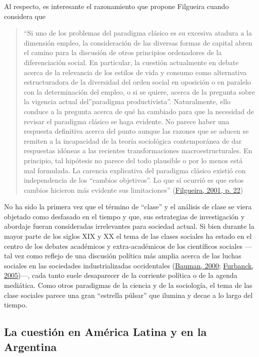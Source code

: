 \documentclass[
]{article}
\begin{document}
Al respecto, es interesante el razonamiento que propone Filgueira cuando considera que

\begin{quote}
``Si uno de los problemas del paradigma clásico es su excesiva atadura a la dimensión empleo, la consideración de las diversas formas de capital abren el camino para la discusión de otros principios ordenadores de la diferenciación social. En particular, la cuestión actualmente en debate acerca de la relevancia de los estilos de vida y consumo como alternativa estructuradora de la diversidad del orden social en oposición o en paralelo con la determinación del empleo, o si se quiere, acerca de la pregunta sobre la vigencia actual del''paradigma productivista''. Naturalmente, ello conduce a la pregunta acerca de qué ha cambiado para que la necesidad de revisar el paradigma clásico se haga evidente. No parece haber una respuesta definitiva acerca del punto aunque las razones que se aducen se remiten a la incapacidad de la teoría sociológica contemporánea de dar respuestas idóneas a las recientes transformaciones macroestructurales. En principio, tal hipótesis no parece del todo plausible o por lo menos está mal formulada. La carencia explicativa del paradigma clásico existió con independencia de los ``cambios objetivos''. Lo que sí ocurrió es que estos cambios hicieron más evidente sus limitaciones'' (\protect\hyperlink{ref-Filgueira2001}{Filgueira, 2001, p. 22})
\end{quote}

No ha sido la primera vez que el término de ``clase'' y el análisis de clase se viera objetado como desfasado en el tiempo y que, sus estrategias de investigación y abordaje fueran consideradas irrelevantes para sociedad actual. Si bien durante la mayor parte de los siglos XIX y XX el tema de las clases sociales ha estado en el centro de los debates académicos y extra-académicos de los científicos sociales ---tal vez como reflejo de una discusión política más amplia acerca de las luchas sociales en las sociedades industrializadas occidentales (\protect\hyperlink{ref-Bauman2000}{Bauman, 2000}; \protect\hyperlink{ref-Furbanck2005}{Furbanck, 2005})---, cada tanto suele desaparecer de la corriente política o de la agenda mediática. Como otros paradigmas de la ciencia y de la sociología, el tema de las clase sociales parece una gran ``estrella púlsar'' que ilumina y decae a lo largo del tiempo.

\hypertarget{cuestion}{%
\subsection{La cuestión en América Latina y en la Argentina}\label{cuestion}}
\end{document}
